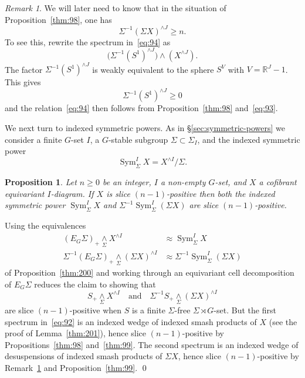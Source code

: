 \documentclass{amsart}
\newtheorem{prop}[equation]{Proposition}
\newtheorem{rem}[equation]{Remark}
\theoremstyle{definition}
\theoremstyle{remark}
\newtheorem{rem}[equation]{Remark}
\newenvironment{pf}{\bigskip{\em Proof:\/}}{\qed\medskip}
\newcommand{\R}{{\mathbb R}}
\DeclareMathOperator{\sym}{Sym}
\newcommand{\smashove}[1]{\underset{#1}{\wedge}}
\newcommand{\eggroup}[2]{E_{#1}#2}
\newcommand{\egsigma}[1]{\eggroup{#1}{\Sigma}}
\begin{document}
\begin{rem}
\label{rem:15} We will later need to know that in the situation of
Proposition~\ref{thm:98}, one has
\begin{equation}
\label{eq:94}
\Sigma^{-1} (\Sigma X)^{\wedge J} \ge n.
\end{equation}
To see this, rewrite the spectrum in~\eqref{eq:94} as
\[
\big(\Sigma^{-1} (S^{1})^{\wedge J})\wedge (X^{\wedge J}).
\]
The factor $\Sigma^{-1} (S^{1})^{\wedge J}$ is weakly equivalent to
the sphere $S^{V}$ with $V=\R^{J}-1$.  This gives
\[
\Sigma^{-1} (S^{1})^{\wedge J}\ge
0
\]
and the relation~\eqref{eq:94} then follows from
Proposition~\ref{thm:98} and~\eqref{eq:93}.
\end{rem}

We next turn to indexed symmetric powers.  As in
\S\ref{sec:symmetric-powers} we consider a finite $G$-set $I$, a
$G$-stable subgroup $\Sigma\subset \Sigma_{I}$, and the indexed
symmetric power
\[
\sym^{I}_{\Sigma}X = X^{\wedge I}/\Sigma.
\]

\begin{prop}
\label{thm:91} Let $n\ge 0$ be an integer, $I$ a non-empty $G$-set,
and $X$ a cofibrant equivariant $I$-diagram.  If $X$ is slice
$(n-1)$-positive then both the indexed symmetric power
$\sym^{I}_{\Sigma}X$ and $\Sigma^{-1}\sym^{I}_{\Sigma}(\Sigma X)$
are slice $(n-1)$-positive.
\end{prop}

\begin{pf}
Using the equivalences
\begin{align*}
(\egsigma{G})_{+}\smashove{\Sigma} X^{\wedge I} &
\approx\sym^{I}_{\Sigma}X  \\
\Sigma^{-1} (\egsigma{G})_{+}\smashove{\Sigma}
(\Sigma X)^{\wedge I} & \approx \Sigma^{-1}\sym^{I}_{\Sigma}(\Sigma X) 
\end{align*}
of Proposition~\ref{thm:200} and working through an equivariant cell
decomposition of $\egsigma{G}$  reduces the claim to showing that 
\begin{equation}
\label{eq:92}
S_{+}\smashove{\Sigma}X^{\wedge I}  \quad\text{and}\quad
\Sigma^{-1}S_{+}\smashove{\Sigma}(\Sigma X)^{\wedge I} 
\end{equation}
are slice $(n-1)$-positive when $S$ is a finite $\Sigma$-free
$\Sigma\rtimes G$-set.  But the first spectrum in~\eqref{eq:92} is an
indexed wedge of indexed smash products of $X$ (see the proof of
Lemma~\ref{thm:201}), hence slice $(n-1)$-positive by
Propositions~\ref{thm:98} and~\ref{thm:99}.  The second spectrum is an
indexed wedge of desuspensions of indexed smash products of $\Sigma
X$, hence slice $(n-1)$-positive by Remark~\ref{rem:15} and
Proposition~\ref{thm:99}.
\end{pf}
\end{document}
